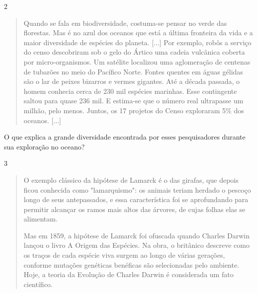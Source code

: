 \num{2}

\begin{quote}
Quando se fala em biodiversidade, costuma-se pensar no verde das florestas. Mas é no azul dos oceanos que está a última fronteira da vida e a maior diversidade de espécies do planeta. [...] Por exemplo, robôs a serviço do censo descobriram sob o gelo do Ártico uma cadeia vulcânica coberta por micro-organismos. Um satélite localizou uma aglomeração de centenas de tubarões no meio do Pacífico Norte. Fontes quentes em águas gélidas são o lar de peixes bizarros e vermes gigantes. Até a década passada, o homem conhecia cerca de 230 mil espécies marinhas. Esse contingente saltou para quase 236 mil. E estima-se que o número real ultrapasse um milhão, pelo menos. Juntos, os 17 projetos do Censo exploraram 5\% dos oceanos. [...]

\end{quote}

O que explica a grande diversidade encontrada por esses pesquisadores
durante sua exploração no oceano?



\num{3}

\begin{quote}
O exemplo clássico da hipótese de Lamarck é o das girafas, que depois ficou conhecida como "lamarquismo": os animais teriam herdado o pescoço longo de seus antepassados, e essa característica foi se aprofundando para permitir alcançar os ramos mais altos das árvores, de cujas folhas elas se alimentam.

Mas em 1859, a hipótese de Lamarck foi ofuscada quando Charles Darwin
lançou o livro A Origem das Espécies. Na obra, o britânico descreve como
os traços de cada espécie viva surgem ao longo de várias gerações,
conforme mutações genéticas benéficas são selecionadas pelo ambiente.
Hoje, a teoria da Evolução de Charles Darwin é considerada um fato
científico.

\end{quote}

